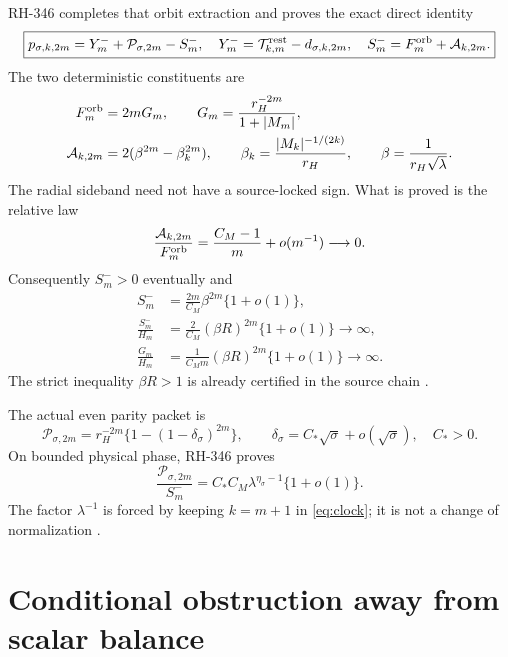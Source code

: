 \documentclass[11pt]{article}
\theoremstyle{remark}
\newcommand{\cP}{\mathcal P}
\newcommand{\cA}{\mathcal A}
\newcommand{\cT}{\mathcal T}
\begin{document}
RH-346 completes that orbit extraction and proves the exact direct identity
\begin{equation}\label{eq:lower}
 \boxed{
 p_{\sigma,k,2m}=Y_m^-+\cP_{\sigma,2m}-S_m^-,
 \quad
 Y_m^-=\cT_{k,m}^{\rm rest}-d_{\sigma,k,2m},
 \quad
 S_m^-=F_m^{\rm orb}+\cA_{k,2m}.}
\end{equation}
The two deterministic constituents are
\begin{align}
 F_m^{\rm orb}&=2mG_m,\qquad
 G_m=\frac{r_H^{-2m}}{1+|M_m|},\label{eq:full-atom}\\
 \cA_{k,2m}&=2(\beta^{2m}-\beta_k^{2m}),\qquad
 \beta_k=\frac{|M_k|^{-1/(2k)}}{r_H},\qquad
 \beta=\frac1{r_H\sqrt\lambda}.\label{eq:radial}
\end{align}
The radial sideband need not have a source-locked sign.  What is proved is
the relative law
\begin{equation}\label{eq:relative}
 \frac{\cA_{k,2m}}{F_m^{\rm orb}}
 =\frac{C_M-1}{m}+o(m^{-1})\longrightarrow0.
\end{equation}
Consequently $S_m^->0$ eventually and
\begin{align}
 S_m^-&=\frac{2m}{C_M}\beta^{2m}\{1+o(1)\},
 \label{eq:S-scale}\\
 \frac{S_m^-}{H_m}
 &=\frac2{C_M}(\beta R)^{2m}\{1+o(1)\}
 \longrightarrow\infty,\label{eq:S-over-H}\\
 \frac{G_m}{H_m}
 &=\frac1{C_Mm}(\beta R)^{2m}\{1+o(1)\}
 \longrightarrow\infty.\label{eq:G-over-H}
\end{align}
The strict inequality $\beta R>1$ is already certified in the source chain
\citep{WangProjectorMass2026,WangCompleteLower2026}.

The actual even parity packet is
\begin{equation}\label{eq:parity}
 \cP_{\sigma,2m}
 =r_H^{-2m}\{1-(1-\delta_\sigma)^{2m}\},
 \qquad
 \delta_\sigma=C_*\sqrt\sigma+o(\sqrt\sigma),\quad C_*>0.
\end{equation}
On bounded physical phase, RH-346 proves
\begin{equation}\label{eq:phase-law}
 \frac{\cP_{\sigma,2m}}{S_m^-}
 =C_*C_M\lambda^{\eta_\sigma-1}\{1+o(1)\}.
\end{equation}
The factor $\lambda^{-1}$ is forced by keeping $k=m+1$ in
\eqref{eq:clock}; it is not a change of normalization
\citep{WangParityBoundary2026,WangFirstAlias2026}.

\section{Conditional obstruction away from scalar balance}
\end{document}
